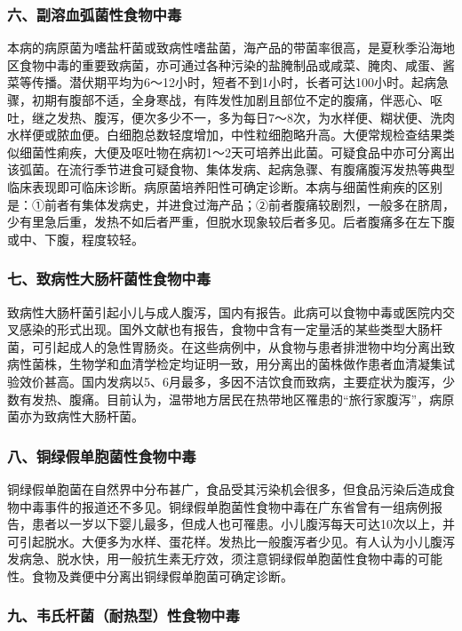 \subsubsection{六、副溶血弧菌性食物中毒}

本病的病原菌为嗜盐杆菌或致病性嗜盐菌，海产品的带菌率很高，是夏秋季沿海地区食物中毒的重要致病菌，亦可通过各种污染的盐腌制品或咸菜、腌肉、咸蛋、酱菜等传播。潜伏期平均为6～12小时，短者不到1小时，长者可达100小时。起病急骤，初期有腹部不适，全身寒战，有阵发性加剧且部位不定的腹痛，伴恶心、呕吐，继之发热、腹泻，便次多少不一，多为每日7～8次，为水样便、糊状便、洗肉水样便或脓血便。白细胞总数轻度增加，中性粒细胞略升高。大便常规检查结果类似细菌性痢疾，大便及呕吐物在病初1～2天可培养出此菌。可疑食品中亦可分离出该弧菌。在流行季节进食可疑食物、集体发病、起病急骤、有腹痛腹泻发热等典型临床表现即可临床诊断。病原菌培养阳性可确定诊断。本病与细菌性痢疾的区别是：①前者有集体发病史，并进食过海产品；②前者腹痛较剧烈，一般多在脐周，少有里急后重，发热不如后者严重，但脱水现象较后者多见。后者腹痛多在左下腹或中、下腹，程度较轻。

\subsubsection{七、致病性大肠杆菌性食物中毒}

致病性大肠杆菌引起小儿与成人腹泻，国内有报告。此病可以食物中毒或医院内交叉感染的形式出现。国外文献也有报告，食物中含有一定量活的某些类型大肠杆菌，可引起成人的急性胃肠炎。在这些病例中，从食物与患者排泄物中均分离出致病性菌株，生物学和血清学检定均证明一致，用分离出的菌株做作患者血清凝集试验效价甚高。国内发病以5、6月最多，多因不洁饮食而致病，主要症状为腹泻，少数有发热、腹痛。目前认为，温带地方居民在热带地区罹患的“旅行家腹泻”，病原菌亦为致病性大肠杆菌。

\subsubsection{八、铜绿假单胞菌性食物中毒}

铜绿假单胞菌在自然界中分布甚广，食品受其污染机会很多，但食品污染后造成食物中毒事件的报道还不多见。铜绿假单胞菌性食物中毒在广东省曾有一组病例报告，患者以一岁以下婴儿最多，但成人也可罹患。小儿腹泻每天可达10次以上，并可引起脱水。大便多为水样、蛋花样。发热比一般腹泻者少见。有人认为小儿腹泻发病急、脱水快，用一般抗生素无疗效，须注意铜绿假单胞菌性食物中毒的可能性。食物及粪便中分离出铜绿假单胞菌可确定诊断。

\subsubsection{九、韦氏杆菌（耐热型）性食物中毒}

